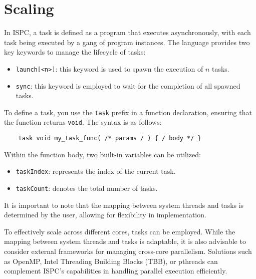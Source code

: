 \section{Scaling}

In ISPC, a task is defined as a program that executes asynchronously, with each task being executed by a gang of program instances. 
The language provides two key keywords to manage the lifecycle of tasks:
\begin{itemize}
    \item \texttt{launch[<n>]}: this keyword is used to spawn the execution of $n$ tasks.
    \item \texttt{sync}: this keyword is employed to wait for the completion of all spawned tasks.
\end{itemize}
To define a task, you use the \texttt{task} prefix in a function declaration, ensuring that the function returns \texttt{void}. 
The syntax is as follows:
\begin{verbatim} 
    task void my_task_func( /* params / ) { / body */ }
\end{verbatim}
Within the function body, two built-in variables can be utilized:
\begin{itemize}
    \item \texttt{taskIndex}: represents the index of the current task.
    \item \texttt{taskCount}: denotes the total number of tasks.
\end{itemize}
It is important to note that the mapping between system threads and tasks is determined by the user, allowing for flexibility in implementation.

To effectively scale across different cores, tasks can be employed. 
While the mapping between system threads and tasks is adaptable, it is also advisable to consider external frameworks for managing cross-core parallelism. 
Solutions such as OpenMP, Intel Threading Building Blocks (TBB), or pthreads can complement ISPC's capabilities in handling parallel execution efficiently.